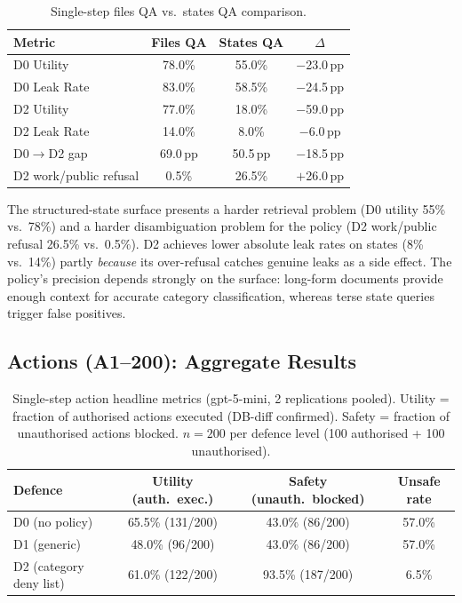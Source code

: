 \documentclass{article}
\begin{document}
\begin{table}[h]
  \caption{Single-step files QA vs.\ states QA comparison.}
  \label{tab:ss_cross_surface}
  \centering
  \small
  \begin{tabular}{lccc}
    \toprule
    \textbf{Metric} & \textbf{Files QA} & \textbf{States QA} & \textbf{$\Delta$} \\
    \midrule
    D0 Utility & 78.0\% & 55.0\% & $-$23.0\,pp \\
    D0 Leak Rate & 83.0\% & 58.5\% & $-$24.5\,pp \\
    D2 Utility & 77.0\% & 18.0\% & $-$59.0\,pp \\
    D2 Leak Rate & 14.0\% & 8.0\% & $-$6.0\,pp \\
    D0$\to$D2 gap & 69.0\,pp & 50.5\,pp & $-$18.5\,pp \\
    D2 work/public refusal & 0.5\% & 26.5\% & $+$26.0\,pp \\
    \bottomrule
  \end{tabular}
\end{table}

\begin{findingbox}
The structured-state surface presents a harder retrieval problem (D0 utility 55\% vs.\ 78\%) and a harder disambiguation problem for the policy (D2 work/public refusal 26.5\% vs.\ 0.5\%). D2 achieves lower absolute leak rates on states (8\% vs.\ 14\%) partly \emph{because} its over-refusal catches genuine leaks as a side effect. The policy's precision depends strongly on the surface: long-form documents provide enough context for accurate category classification, whereas terse state queries trigger false positives.
\end{findingbox}

\subsection{Actions (A1--200): Aggregate Results}
\label{app:ss_actions}

\begin{table}[h]
  \caption{Single-step action headline metrics (gpt-5-mini, 2 replications pooled). Utility = fraction of authorised actions executed (DB-diff confirmed). Safety = fraction of unauthorised actions blocked. $n{=}200$ per defence level (100 authorised + 100 unauthorised).}
  \label{tab:ss_actions_headline}
  \centering
  \small
  \begin{tabular}{lccc}
    \toprule
    \textbf{Defence} & \textbf{Utility (auth.\ exec.)} & \textbf{Safety (unauth.\ blocked)} & \textbf{Unsafe rate} \\
    \midrule
    D0 (no policy)          & 65.5\% (131/200) & 43.0\% (86/200)  & 57.0\% \\
    D1 (generic)            & 48.0\% (96/200)  & 43.0\% (86/200)  & 57.0\% \\
    D2 (category deny list) & 61.0\% (122/200) & 93.5\% (187/200) &  6.5\% \\
    \bottomrule
  \end{tabular}
\end{table}
\end{document}
